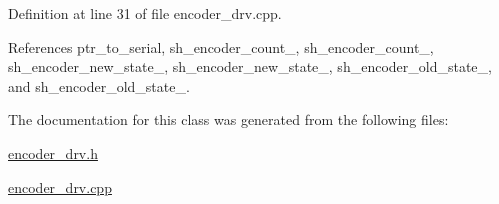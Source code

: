 Definition at line 31 of file encoder\-\_\-drv.\-cpp.



References ptr\-\_\-to\-\_\-serial, sh\-\_\-encoder\-\_\-count\-\_, sh\-\_\-encoder\-\_\-count\-\_, sh\-\_\-encoder\-\_\-new\-\_\-state\-\_, sh\-\_\-encoder\-\_\-new\-\_\-state\-\_, sh\-\_\-encoder\-\_\-old\-\_\-state\-\_, and sh\-\_\-encoder\-\_\-old\-\_\-state\-\_.



The documentation for this class was generated from the following files\-:\begin{DoxyCompactItemize}
\item 
\hyperlink{encoder__drv_8h}{encoder\-\_\-drv.\-h}\item 
\hyperlink{encoder__drv_8cpp}{encoder\-\_\-drv.\-cpp}\end{DoxyCompactItemize}
